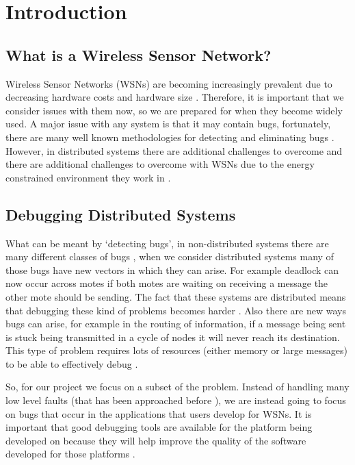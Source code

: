 \section{Introduction}

\subsection{What is a Wireless Sensor Network?}

Wireless Sensor Networks (WSNs) are becoming increasingly prevalent due to decreasing hardware costs and hardware size \cite{TankBible}. Therefore, it is important that we consider issues with them now, so we are prepared for when they become widely used. A major issue with any system is that it may contain bugs, fortunately, there are many well known methodologies for detecting and eliminating bugs \cite{1382572, 749477, ?}. However, in distributed systems there are additional challenges to overcome \cite{5010224} and there are additional challenges to overcome with WSNs due to the energy constrained environment they work in \cite{?}.


\subsection{Debugging Distributed Systems}

What can be meant by `detecting bugs', in non-distributed systems there are many different classes of bugs \cite{?}, when we consider distributed systems many of those bugs have new vectors in which they can arise. For example deadlock can now occur across motes if both motes are waiting on receiving a message the other mote should be sending. The fact that these systems are distributed means that debugging these kind of problems becomes harder \cite{?}. Also there are new ways bugs can arise, for example in the routing of information, if a message being sent is stuck being transmitted in a cycle of nodes it will never reach its destination. This type of problem requires lots of resources (either memory or large messages) to be able to effectively debug \cite{?}.

So, for our project we focus on a subset of the problem. Instead of handling many low level faults (that has been approached before \cite{NodeMD}), we are instead going to focus on bugs that occur in the applications that users develop for WSNs. It is important that good debugging tools are available for the platform being developed on because they will help improve the quality of the software developed for those platforms \cite{?}.


